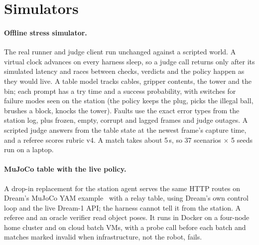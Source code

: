 \documentclass[10pt]{article}
\newcommand{\dream}{Dream-1}
\begin{document}
\section{Simulators}
\label{sec:sims}

\paragraph{Offline stress simulator.} The real runner and judge client run unchanged against a scripted world. A virtual clock
advances on every harness sleep, so a judge call returns only after its simulated latency and races between checks, verdicts and
the policy happen as they would live. A table model tracks cables, gripper contents, the tower and the bin; each prompt has a try
time and a success probability, with switches for failure modes seen on the station (the policy keeps the plug, picks the illegal
ball, brushes a block, knocks the tower). Faults use the exact error types from the station log, plus frozen, empty, corrupt and
lagged frames and judge outages. A scripted judge answers from the table state at the newest frame's capture time, and a referee
scores rubric v4. A match takes about 5\,s, so 37 scenarios $\times$ 5 seeds run on a laptop.

\paragraph{MuJoCo table with the live policy.} A drop-in replacement for the station agent serves the same HTTP routes on Dream's
MuJoCo YAM example~\cite{todorov2012mujoco} with a relay table, using Dream's own control loop and the live \dream{} API; the
harness cannot tell it from the station. A referee and an oracle verifier read object poses. It runs in Docker on a four-node home
cluster and on cloud batch VMs, with a probe call before each batch and matches marked invalid when infrastructure, not the robot,
fails.
\end{document}
